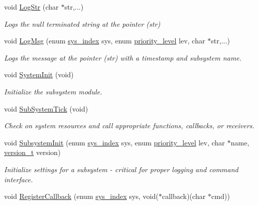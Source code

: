 \begin{DoxyCompactItemize}
\item 
void \hyperlink{group__subsys_gad5c93d1d78ea66a8e631957653e03a74}{Log\+Str} (char $\ast$str,...)
\begin{DoxyCompactList}\small\item\em Logs the null terminated string at the pointer (str) \end{DoxyCompactList}\item 
void \hyperlink{group__subsys_ga450327eef2cd5f75293d462e72c81d63}{Log\+Msg} (enum \hyperlink{group__subsys_gadc5d9f07ddb402114afea1177fc9301b}{sys\+\_\+index} sys, enum \hyperlink{group__subsys_ga1d309594956a828563f9181d766daa08}{priority\+\_\+level} lev, char $\ast$str,...)
\begin{DoxyCompactList}\small\item\em Logs the message at the pointer (str) with a timestamp and subsystem name. \end{DoxyCompactList}\item 
void \hyperlink{group__subsys_ga93f514700ccf00d08dbdcff7f1224eb2}{System\+Init} (void)
\begin{DoxyCompactList}\small\item\em Initialize the subsystem module. \end{DoxyCompactList}\item 
void \hyperlink{group__subsys_ga395cbaf6db74454b690e444a3dddb8c1}{Sub\+System\+Tick} (void)
\begin{DoxyCompactList}\small\item\em Check on system resources and call appropriate functions, callbacks, or receivers. \end{DoxyCompactList}\item 
void \hyperlink{group__subsys_ga4cb5a7bc96bce54eaedba65a8f4847b5}{Subsystem\+Init} (enum \hyperlink{group__subsys_gadc5d9f07ddb402114afea1177fc9301b}{sys\+\_\+index} sys, enum \hyperlink{group__subsys_ga1d309594956a828563f9181d766daa08}{priority\+\_\+level} lev, char $\ast$name, \hyperlink{unionversion__t}{version\+\_\+t} version)
\begin{DoxyCompactList}\small\item\em Initialize settings for a subsystem -\/ critical for proper logging and command interface. \end{DoxyCompactList}\item 
void \hyperlink{group__subsys_ga7b8ad0486f5f208eef9d58b06931e7ca}{Register\+Callback} (enum \hyperlink{group__subsys_gadc5d9f07ddb402114afea1177fc9301b}{sys\+\_\+index} sys, void($\ast$callback)(char $\ast$cmd))

\end{DoxyCompactItemize}
